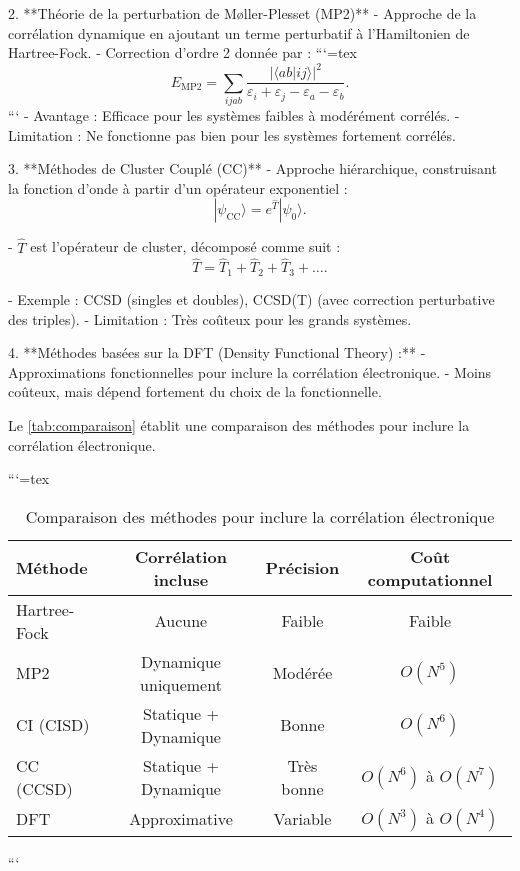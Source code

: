 \documentclass[12pt,a4paper]{report}
\numberwithin{equation}{section}
\numberwithin{figure}{section}
\numberwithin{table}{section}
\begin{document}
\begin{markdown}
2. **Théorie de la perturbation de Møller-Plesset (MP2)**
   - Approche de la corrélation dynamique en ajoutant un terme perturbatif à l'Hamiltonien de Hartree-Fock.
   - Correction d'ordre 2 donnée par :
```{=tex}
\begin{equation}
E_{\text{MP2}} = \sum_{ijab} \frac{|\langle ab | ij \rangle|^2}{\varepsilon_i + \varepsilon_j - \varepsilon_a - \varepsilon_b} .
\end{equation}
```
   - Avantage : Efficace pour les systèmes faibles à modérément corrélés.
   - Limitation : Ne fonctionne pas bien pour les systèmes fortement corrélés.

3. **Méthodes de Cluster Couplé (CC)**
   - Approche hiérarchique, construisant la fonction d’onde à partir d’un opérateur exponentiel :
\begin{equation}
|\psi_{\text{CC}}\rangle = e^{\hat{T}} |\psi_0\rangle .
\end{equation}

   - $\hat{T}$ est l’opérateur de cluster, décomposé comme suit :
\begin{equation}
\hat{T} = \hat{T}_1 + \hat{T}_2 + \hat{T}_3 + \dots .
\end{equation}

   - Exemple : CCSD (singles et doubles), CCSD(T) (avec correction perturbative des triples).
   - Limitation : Très coûteux pour les grands systèmes.

4. **Méthodes basées sur la DFT (Density Functional Theory) :**
   - Approximations fonctionnelles pour inclure la corrélation électronique.
   - Moins coûteux, mais dépend fortement du choix de la fonctionnelle.

Le \autoref{tab:comparaison} établit une comparaison des méthodes pour inclure la corrélation électronique.

```{=tex}
\begin{table}[h!]
\centering
\caption{Comparaison des méthodes pour inclure la corrélation électronique}
\begin{tabular}{@{}lccc@{}}
\toprule
\textbf{Méthode}       & \textbf{Corrélation incluse} & \textbf{Précision}  & \textbf{Coût computationnel} \\ \midrule
Hartree-Fock           & Aucune                      & Faible              & Faible                       \\
MP2                    & Dynamique uniquement        & Modérée             & $O(N^5)$                     \\
CI (CISD)              & Statique + Dynamique        & Bonne               & $O(N^6)$                     \\
CC (CCSD)              & Statique + Dynamique        & Très bonne          & $O(N^6)$ à $O(N^7)$          \\
DFT                    & Approximative               & Variable            & $O(N^3)$ à $O(N^4)$          \\ \bottomrule
\end{tabular}
\label{tab:comparaison}
\end{table}
```


\end{markdown}
\end{document}
